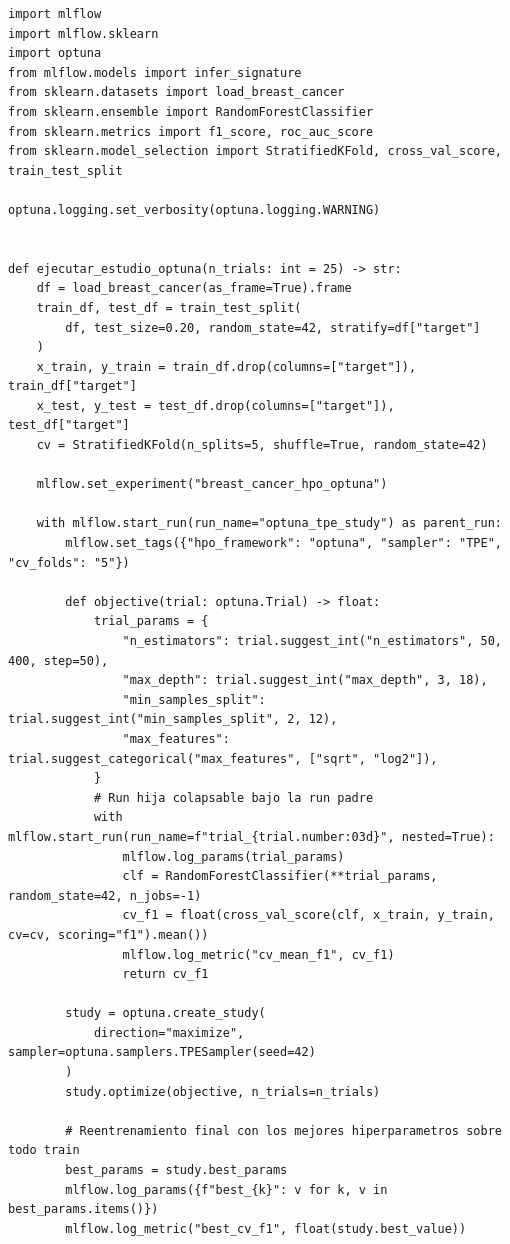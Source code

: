 \begin{lstlisting}[style=python, caption={Optimización bayesiana con Optuna integrada con runs anidados (nested=True) en MLflow Tracking.}, label={lst:mlflow-optuna-nested}]
import mlflow
import mlflow.sklearn
import optuna
from mlflow.models import infer_signature
from sklearn.datasets import load_breast_cancer
from sklearn.ensemble import RandomForestClassifier
from sklearn.metrics import f1_score, roc_auc_score
from sklearn.model_selection import StratifiedKFold, cross_val_score, train_test_split

optuna.logging.set_verbosity(optuna.logging.WARNING)


def ejecutar_estudio_optuna(n_trials: int = 25) -> str:
    df = load_breast_cancer(as_frame=True).frame
    train_df, test_df = train_test_split(
        df, test_size=0.20, random_state=42, stratify=df["target"]
    )
    x_train, y_train = train_df.drop(columns=["target"]), train_df["target"]
    x_test, y_test = test_df.drop(columns=["target"]), test_df["target"]
    cv = StratifiedKFold(n_splits=5, shuffle=True, random_state=42)

    mlflow.set_experiment("breast_cancer_hpo_optuna")

    with mlflow.start_run(run_name="optuna_tpe_study") as parent_run:
        mlflow.set_tags({"hpo_framework": "optuna", "sampler": "TPE", "cv_folds": "5"})

        def objective(trial: optuna.Trial) -> float:
            trial_params = {
                "n_estimators": trial.suggest_int("n_estimators", 50, 400, step=50),
                "max_depth": trial.suggest_int("max_depth", 3, 18),
                "min_samples_split": trial.suggest_int("min_samples_split", 2, 12),
                "max_features": trial.suggest_categorical("max_features", ["sqrt", "log2"]),
            }
            # Run hija colapsable bajo la run padre
            with mlflow.start_run(run_name=f"trial_{trial.number:03d}", nested=True):
                mlflow.log_params(trial_params)
                clf = RandomForestClassifier(**trial_params, random_state=42, n_jobs=-1)
                cv_f1 = float(cross_val_score(clf, x_train, y_train, cv=cv, scoring="f1").mean())
                mlflow.log_metric("cv_mean_f1", cv_f1)
                return cv_f1

        study = optuna.create_study(
            direction="maximize", sampler=optuna.samplers.TPESampler(seed=42)
        )
        study.optimize(objective, n_trials=n_trials)

        # Reentrenamiento final con los mejores hiperparametros sobre todo train
        best_params = study.best_params
        mlflow.log_params({f"best_{k}": v for k, v in best_params.items()})
        mlflow.log_metric("best_cv_f1", float(study.best_value))


\end{lstlisting}

